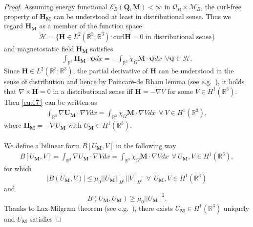 \documentclass{article}
\def\Qvec{\mathbf{Q}}
\def \Mvec{\mathbf{M}}
\def\Hvec{\mathbf{H}}
\begin{document}
\begin{proof}
Assuming energy functional $\mathcal{E}^{\varepsilon}_B\left(\Qvec, \Mvec\right)<\infty$ in $\mathcal{Q}_B\times\mathcal{M}_B$, the curl-free property of $\Hvec_{\Mvec}$ can be understood at least in distributional sense.
Thus we regard $\textbf{H}_{\textbf{M}}$ as a member of the function space
\begin{eqnarray}
\mathcal{H} = \{\textbf{H}\in L^2\left(\mathbb R^3; \mathbb R^3\right): \mbox{curl}\textbf{H} = 0 \mbox{ in distributional sense} \}   
\end{eqnarray}
and magnetostatic field $\textbf{H}_{\textbf{M}}$ satisfies
\begin{eqnarray}
\int_{\mathbb R^3}\textbf{H}_{\textbf{M}}\cdot\bm{\psi} dx = -\int_{\mathbb R^3}\chi_{\Omega}\textbf{M}\cdot\bm{\psi} dx ~~\forall\bm{\psi}\in \mathcal{H}.\label{eq:17'}   \end{eqnarray}
Since $\textbf{H}\in L^2\left(\mathbb R^3; \mathbb R^3\right)$, the partial derivative of $\textbf{H}$ can be understood in the sense of distribution and hence by Poincaré-de Rham lemma (see e.g.\ \cite{spivak2018calculus}), it holds that $\nabla\times \textbf{H} = 0$ in a distributional sense iff $\textbf{H} = -\nabla V$ for some $V\in H^1\left(\mathbb R^3\right)$. Then \eqref{eq:17'} can be written as
\begin{eqnarray}\label{18}
\int_{\mathbb R^3}\nabla \textbf{U}_{\textbf{M}}\cdot\nabla Vdx = \int_{\mathbb R^3}\chi_{\Omega}\textbf{M}\cdot \nabla Vdx ~~\forall~V\in H^1\left(\mathbb R^3\right),
\end{eqnarray}
where $\textbf{H}_{\textbf{M}} = -\nabla U_{\textbf{M}}$ with $U_{\textbf{M}}\in H^1\left(\mathbb R^3\right)$.\\
\\
We define a bilinear form $B[U_{\textbf{M}}, V]$ in the following way
\begin{eqnarray}\label{19}
B[U_{\textbf{M}}, V] = \int_{\mathbb R^3}\nabla U_{\textbf{M}}\cdot\nabla Vdx = \int_{\mathbb R^3}\chi_{\Omega}\textbf{M}\cdot \nabla Vdx~~\forall~U_{\textbf{M}}, V\in H^1\left(\mathbb R^3\right),
\end{eqnarray}
for which
$$|B\left(U_{\textbf{M}}, V\right)|\le \mu_0||U_{\textbf{M}}||_{H^1}||V||_{H^1}~~\forall~~U_{\textbf{M}}, V\in H^1\left(\mathbb R^3\right)$$
and
$$B\left(U_{\textbf{M}}, U_{\textbf{M}}\right)\ge \mu_0||U_{\textbf{M}}||^2.$$
Thanks to Lax-Milgram theorem (see e.g.\ \cite{evans2022partial}), there exists $U_{\textbf{M}}\in H^1\left(\mathbb R^3\right)$ uniquely and $U_{\textbf{M}}$ satisfies

\end{proof}
\end{document}
